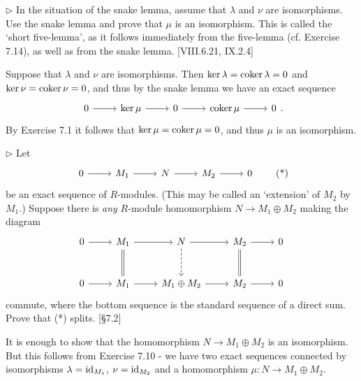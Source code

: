 \begin{problem}
	$\triangleright$ In the situation of the snake lemma, assume that $\lambda$ and $\nu$ are isomorphisms. Use the snake lemma and prove that $\mu$ is an isomorphism. This is called the `short five-lemma', as it follows immediately from the five-lemma (cf. Exercise 7.14), as well as from the snake lemma. [VIII.6.21, IX.2.4]
\end{problem}

\begin{solution}
	Suppose that $\lambda$ and $\nu$ are isomorphisms. Then $\ker \lambda = \operatorname{coker} \lambda = 0$ and $\ker \nu = \operatorname{coker} \nu = 0$, and thus by the snake lemma we have an exact sequence
	\[
		\begin{tikzcd}
			0
			\arrow[r]
			& \ker \mu
			\arrow[r]
			& 0
			\arrow[r]
			& \coker \mu
			\arrow[r]
			& 0
		\end{tikzcd} \text{.}
	\]
	By Exercise 7.1 it follows that $\ker \mu = \operatorname{coker} \mu = 0$, and thus $\mu$ is an isomorphism.
\end{solution}

\begin{problem}
	$\triangleright$ Let
	\begin{equation}
		\begin{tikzcd}
			0
			\arrow[r]
			& M_1
			\arrow[r]
			& N
			\arrow[r]
			& M_2
			\arrow[r]
			& 0
		\end{tikzcd}
		\tag{*}
	\end{equation}
	be an exact sequence of $R$-modules. (This may be called an `extension' of $M_2$ by $M_1$.) Suppose there is \emph{any} $R$-module homomorphism $N \to M_1 \oplus M_2$ making the diagram
	\[
		\begin{tikzcd}[row sep=large]
			0
			\arrow[r]
			& M_1
			\arrow[r]
			\arrow[d, equal]
			& N
			\arrow[r]
			\arrow[d, dashed]
			& M_2
			\arrow[r]
			\arrow[d, equal]
			& 0 \\
			0
			\arrow[r]
			& M_1
			\arrow[r]
			& M_1 \oplus M_2
			\arrow[r]
			& M_2
			\arrow[r]
			& 0
		\end{tikzcd}
	\]
	commute, where the bottom sequence is the standard sequence of a direct sum. Prove that (*) splits. [\S 7.2]
\end{problem}

\begin{solution}
	It is enough to show that the homomorphism $N \to M_1 \oplus M_2$ is an isomorphism. But this follows from Exercise 7.10 - we have two exact sequences connected by isomorphisms $\lambda = \mathrm{id}_{M_1}$, $\nu = \mathrm{id}_{M_2}$ and a homomorphism $\mu: N \to M_1 \oplus M_2$.
\end{solution}

